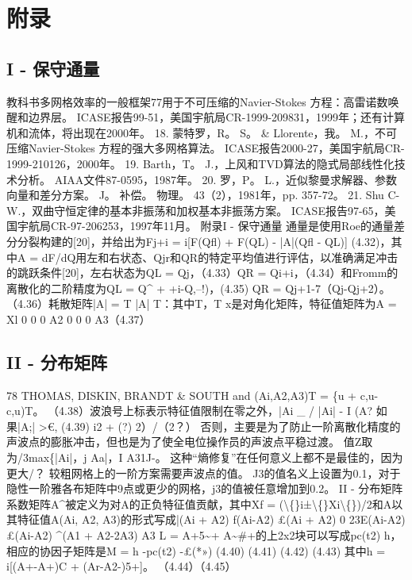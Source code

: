 \documentclass[UTF8,11pt,a4paper,openany,fontset=fandol]{ctexbook}
\begin{document}
\section{附录}
\subsection{I - 保守通量}
教科书多网格效率的一般框架77用于不可压缩的Navier-Stokes 方程：高雷诺数唤醒和边界层。 ICASE报告99-51，美国宇航局CR-1999-209831，1999年；还有计算机和流体，将出现在2000年。 18. 蒙特罗，R。 S。 \& Llorente，我。 M.，不可压缩Navier-Stokes 方程的强大多网格算法。 ICASE报告2000-27，美国宇航局CR-1999-210126，2000年。 19. Barth，T。 J.，上风和TVD算法的隐式局部线性化技术分析。 AIAA文件87-0595，1987年。 20. 罗，P。 L.，近似黎曼求解器、参数向量和差分方案。 J。 补偿。 物理。 43（2），1981年，pp. 357-72。 21. Shu C-W.，双曲守恒定律的基本非振荡和加权基本非振荡方案。 ICASE报告97-65，美国宇航局CR-97-206253，1997年11月。 附录I - 保守通量 通量是使用Roe的通量差分分裂构建的[20]，并给出为Fj+i = i[F(Qfl) + F(QL) - |A|(Qfl - QL)] (4.32)，其中A = dF/dQ用左和右状态、Qjr和QR的特定平均值进行评估，以准确满足冲击的跳跃条件[20]，左右状态为QL = Qj，（4.33）QR = Qi+i，（4.34）和Fromm的离散化的二阶精度为QL = Q\textasciicircum{} + +i-Q,--!)，(4.35) QR = Qj+1-7（Qj-Qj+2）。 （4.36）耗散矩阵|A| = T |A| T：其中T，T x是对角化矩阵，特征值矩阵为A = Xl 0 0 0 A2 0 0 0 A3（4.37）

\subsection{II - 分布矩阵}
78 THOMAS, DISKIN, BRANDT \& SOUTH and (Ai,A2,A3)T = \{u + c,u-c,u)T。 （4.38）波浪号上标表示特征值限制在零之外，|Ai \_ / |Ai| - I (A? 如果|A;| >€, (4.39) i2 + (?) 2）/（2？） 否则，主要是为了防止一阶离散化精度的声波点的膨胀冲击，但也是为了使全电位操作员的声波点平稳过渡。 值Z取为/3max\{|Ai|，j Aa|，I A31J-。 这种“熵修复”在任何意义上都不是最佳的，因为更大/？ 较粗网格上的一阶方案需要声波点的值。 J3的值名义上设置为0.1，对于隐性一阶雅各布矩阵中9点或更少的网格，j3的值被任意增加到0.2。 II - 分布矩阵系数矩阵A\textasciicircum{}被定义为对A的正负特征值贡献，其中Xf = (\textbackslash\{\}i±\textbackslash\{\}Xi\textbackslash\{\})/2和A以其特征值A(Ai, A2, A3)的形式写成|(Ai + A2) f(Ai-A2) £(Ai + A2) 0 23E(Ai-A2) £(Ai-A2) \textasciicircum{}(A1 + A2-2A3) A3 L = A+5\textasciitilde{}+ A\textasciitilde{}\#+的上2x2块可以写成pc(t2) h，相应的协因子矩阵是M = h -pc(t2) -£(*») (4.40) (4.41) (4.42) (4.43) 其中h = i[(A+-A+)C + (Ar-A2-)5+]。 （4.44）（4.45）
\end{document}
